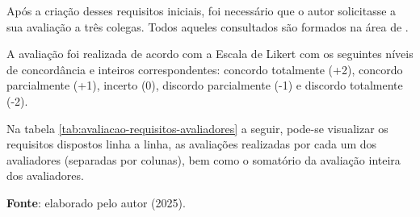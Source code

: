 Após a criação desses requisitos iniciais, foi necessário que o autor solicitasse a sua avaliação a três colegas. Todos aqueles consultados são formados na área de .

A avaliação foi realizada de acordo com a Escala de Likert \cite{likert1932technique} com os seguintes níveis de concordância e inteiros correspondentes: concordo totalmente (+2), concordo  parcialmente (+1), incerto (0), discordo parcialmente (-1) e discordo totalmente (-2).

Na tabela \ref{tab:avaliacao-requisitos-avaliadores} a seguir, pode-se visualizar os requisitos dispostos linha a linha, as avaliações realizadas por cada um dos avaliadores (separadas por colunas), bem como o somatório da avaliação inteira dos avaliadores.

\begin{table}[h]
    \centering
    \caption{Classificação na Escala de Likert dos requisitos pelos entrevistados}
    \small{\textbf{Fonte}: elaborado pelo autor (2025).}
    \label{tab:avaliacao-requisitos-avaliadores}
\end{table}


